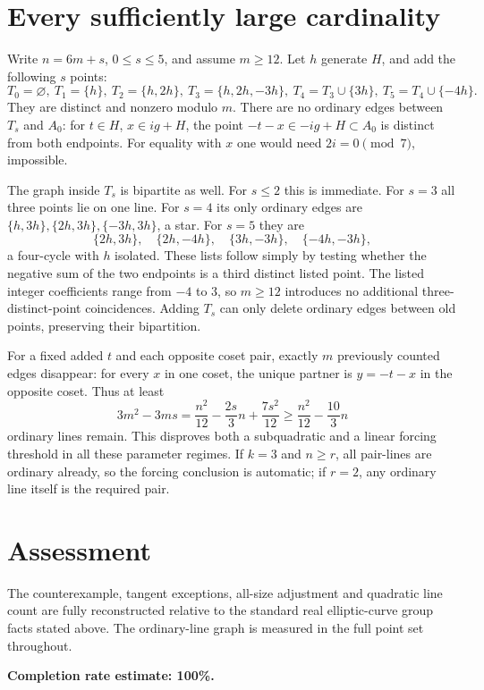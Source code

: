 \documentclass[11pt]{article}
\begin{document}
\section*{Every sufficiently large cardinality}
Write $n=6m+s$, $0\le s\le5$, and assume $m\ge12$. Let $h$ generate $H$, and add the following $s$ points:
\[
 T_0=\varnothing,\ T_1=\{h\},\ T_2=\{h,2h\},\
 T_3=\{h,2h,-3h\},\ T_4=T_3\cup\{3h\},\
 T_5=T_4\cup\{-4h\}.
\]
They are distinct and nonzero modulo $m$. There are no ordinary edges between $T_s$ and $A_0$: for $t\in H$, $x\in ig+H$, the point $-t-x\in-ig+H\subset A_0$ is distinct from both endpoints. For equality with $x$ one would need $2i=0\pmod7$, impossible.

The graph inside $T_s$ is bipartite as well. For $s\le2$ this is immediate. For $s=3$ all three points lie on one line. For $s=4$ its only ordinary edges are $\{h,3h\},\{2h,3h\},\{-3h,3h\}$, a star. For $s=5$ they are
\[
 \{2h,3h\},\quad\{2h,-4h\},\quad\{3h,-3h\},\quad\{-4h,-3h\},
\]
a four-cycle with $h$ isolated. These lists follow simply by testing whether the negative sum of the two endpoints is a third distinct listed point. The listed integer coefficients range from $-4$ to $3$, so $m\ge12$ introduces no additional three-distinct-point coincidences. Adding $T_s$ can only delete ordinary edges between old points, preserving their bipartition.

For a fixed added $t$ and each opposite coset pair, exactly $m$ previously counted edges disappear: for every $x$ in one coset, the unique partner is $y=-t-x$ in the opposite coset. Thus at least
\[
 3m^2-3ms=\frac{n^2}{12}-\frac{2s}{3}n+\frac{7s^2}{12}
 \ge\frac{n^2}{12}-\frac{10}{3}n
\]
ordinary lines remain. This disproves both a subquadratic and a linear forcing threshold in all these parameter regimes. If $k=3$ and $n\ge r$, all pair-lines are ordinary already, so the forcing conclusion is automatic; if $r=2$, any ordinary line itself is the required pair.

\section*{Assessment}
The counterexample, tangent exceptions, all-size adjustment and quadratic line count are fully reconstructed relative to the standard real elliptic-curve group facts stated above. The ordinary-line graph is measured in the full point set throughout.

\textbf{Completion rate estimate: 100\%.}
\end{document}
